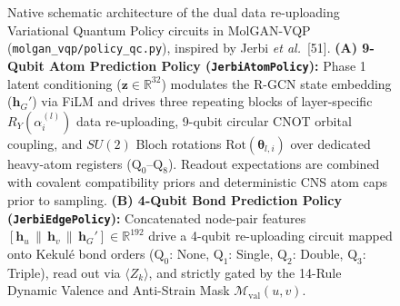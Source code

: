 \documentclass[10pt,a4paper]{article}
\begin{document}
\begin{figure}[!htbp]
\begin{subfigure}{\textwidth}
{%
}
\end{subfigure}
\caption{Native schematic architecture of the dual data re-uploading Variational Quantum Policy circuits in MolGAN-VQP (\texttt{molgan\_vqp/policy\_qc.py}), inspired by Jerbi \textit{et al.}~[51]. \textbf{(A) 9-Qubit Atom Prediction Policy (\texttt{JerbiAtomPolicy}):} Phase 1 latent conditioning ($\mathbf{z} \in \mathbb{R}^{32}$) modulates the R-GCN state embedding ($\mathbf{h}_G'$) via FiLM and drives three repeating blocks of layer-specific $R_Y(\alpha_i^{(l)})$ data re-uploading, 9-qubit circular CNOT orbital coupling, and $SU(2)$ Bloch rotations $\mathrm{Rot}(\boldsymbol{\theta}_{l,i})$ over dedicated heavy-atom registers ($\mathrm{Q}_0$--$\mathrm{Q}_8$). Readout expectations are combined with covalent compatibility priors and deterministic CNS atom caps prior to sampling. \textbf{(B) 4-Qubit Bond Prediction Policy (\texttt{JerbiEdgePolicy}):} Concatenated node-pair features $[\mathbf{h}_u \,\|\, \mathbf{h}_v \,\|\, \mathbf{h}_G'] \in \mathbb{R}^{192}$ drive a 4-qubit re-uploading circuit mapped onto Kekul\'e bond orders ($\mathrm{Q}_0$: None, $\mathrm{Q}_1$: Single, $\mathrm{Q}_2$: Double, $\mathrm{Q}_3$: Triple), read out via $\langle Z_k\rangle$, and strictly gated by the 14-Rule Dynamic Valence and Anti-Strain Mask $\mathcal{M}_{\text{val}}(u,v)$.}
\label{fig:quantum_circuits}
\end{figure}
\end{document}
